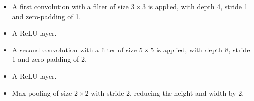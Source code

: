 \begin{itemize}
\item A first convolution with a filter of size $3\times3$ is applied, with depth 4, stride 1 and zero-padding of 1.
\item A ReLU layer.
\item A second convolution with a filter of size $5\times5$ is applied, with depth 8, stride 1 and zero-padding of 2.
\item A ReLU layer.
\item Max-pooling of size $2\times2$ with stride 2, reducing the height and width by 2.
\end{itemize}


